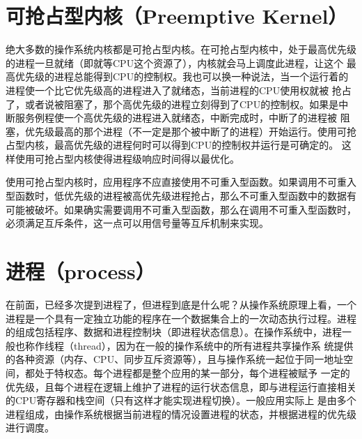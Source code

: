 \documentclass[a4paper,12pt]{report}
\begin{document}
\begin{appendix}
\begin{spacing}{1.5}
\end{spacing}

\section{ 可抢占型内核（Preemptive Kernel）}
\begin{spacing}{1.5}
  绝大多数的操作系统内核都是可抢占型内核。在可抢占型内核中，处于最高优先级的进程一旦就绪（即就等CPU这个资源了），内核就会马上调度此进程，让这个 最高优先级的进程总能得到CPU的控制权。我也可以换一种说法，当一个运行着的进程使一个比它优先级高的进程进入了就绪态，当前进程的CPU使用权就被 抢占了，或者说被阻塞了，那个高优先级的进程立刻得到了CPU的控制权。如果是中断服务例程使一个高优先级的进程进入就绪态，中断完成时，中断了的进程被 阻塞，优先级最高的那个进程（不一定是那个被中断了的进程）开始运行。使用可抢占型内核，最高优先级的进程何时可以得到CPU的控制权并运行是可确定的。 这样使用可抢占型内核使得进程级响应时间得以最优化。

    使用可抢占型内核时，应用程序不应直接使用不可重入型函数。如果调用不可重入型函数时，低优先级的进程被高优先级进程抢占，那么不可重入型函数中的数据有 可能被破坏。如果确实需要调用不可重入型函数，那么在调用不可重入型函数时，必须满足互斥条件，这一点可以用信号量等互斥机制来实现。


\end{spacing}


\section{ 进程（process）}
\begin{spacing}{1.5}
 在前面，已经多次提到进程了，但进程到底是什么呢？从操作系统原理上看，一个进程是一个具有一定独立功能的程序在一个数据集合上的一次动态执行过程。进程 的组成包括程序、数据和进程控制块（即进程状态信息）。在操作系统中，进程一般也称作线程（thread），因为在一般的操作系统中的所有进程共享操作系 统提供的各种资源（内存、CPU、同步互斥资源等），且与操作系统一起位于同一地址空间，都处于特权态。每个进程都是整个应用的某一部分，每个进程被赋予 一定的优先级，且每个进程在逻辑上维护了进程的运行状态信息，即与进程运行直接相关的CPU寄存器和栈空间（只有这样才能实现进程切换）。一般应用实际上 是由多个进程组成，由操作系统根据当前进程的情况设置进程的状态，并根据进程的优先级进行调度。

\end{spacing}




\end{appendix}
\end{document}
